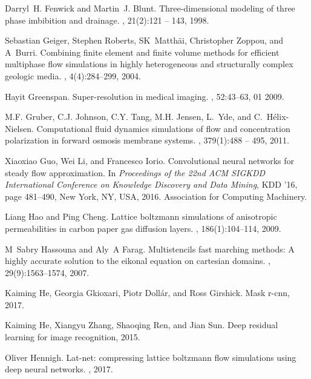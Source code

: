 \documentclass{article}
\begin{document}
\begin{thebibliography}{10}
Darryl~H. Fenwick and Martin~J. Blunt.
\newblock Three-dimensional modeling of three phase imbibition and drainage.
, 21(2):121 -- 143, 1998.

Sebastian Geiger, Stephen Roberts, SK~Matth{\"a}i, Christopher Zoppou, and
  A~Burri.
\newblock Combining finite element and finite volume methods for efficient
  multiphase flow simulations in highly heterogeneous and structurally complex
  geologic media.
, 4(4):284--299, 2004.

Hayit Greenspan.
\newblock Super-resolution in medical imaging.
, 52:43--63, 01 2009.

M.F. Gruber, C.J. Johnson, C.Y. Tang, M.H. Jensen, L.~Yde, and
  C.~Hélix-Nielsen.
\newblock Computational fluid dynamics simulations of flow and concentration
  polarization in forward osmosis membrane systems.
, 379(1):488 -- 495, 2011.

Xiaoxiao Guo, Wei Li, and Francesco Iorio.
\newblock Convolutional neural networks for steady flow approximation.
\newblock In {\em Proceedings of the 22nd ACM SIGKDD International Conference
  on Knowledge Discovery and Data Mining}, KDD ’16, page 481–490, New York,
  NY, USA, 2016. Association for Computing Machinery.

Liang Hao and Ping Cheng.
\newblock Lattice boltzmann simulations of anisotropic permeabilities in carbon
  paper gas diffusion layers.
, 186(1):104--114, 2009.

M~Sabry Hassouna and Aly~A Farag.
\newblock Multistencils fast marching methods: A highly accurate solution to
  the eikonal equation on cartesian domains.
,
  29(9):1563--1574, 2007.

Kaiming He, Georgia Gkioxari, Piotr Dollár, and Ross Girshick.
\newblock Mask r-cnn, 2017.

Kaiming He, Xiangyu Zhang, Shaoqing Ren, and Jian Sun.
\newblock Deep residual learning for image recognition, 2015.

Oliver Hennigh.
\newblock Lat-net: compressing lattice boltzmann flow simulations using deep
  neural networks.
, 2017.


\end{thebibliography}
\end{document}
